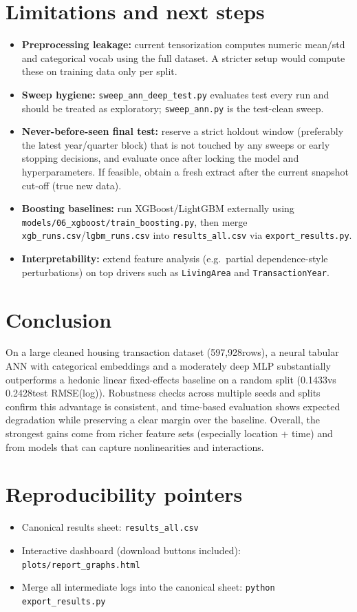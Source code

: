 \documentclass[11pt]{article}
\newcommand{\NTotal}{597{,}928}
\newcommand{\BestAnnTestRmse}{0.1433}
\newcommand{\BestHedTestRmse}{0.2428}
\begin{document}
\section{Limitations and next steps}
\begin{itemize}[leftmargin=*]
  \item \textbf{Preprocessing leakage:} current tensorization computes numeric mean/std and categorical vocab using the full dataset. A stricter setup would compute these on training data only per split.
  \item \textbf{Sweep hygiene:} \texttt{sweep\_ann\_deep\_test.py} evaluates test every run and should be treated as exploratory; \texttt{sweep\_ann.py} is the test-clean sweep.
  \item \textbf{Never-before-seen final test:} reserve a strict holdout window (preferably the latest year/quarter block) that is not touched by any sweeps or early stopping decisions, and evaluate once after locking the model and hyperparameters. If feasible, obtain a fresh extract after the current snapshot cut-off (true new data).
  \item \textbf{Boosting baselines:} run XGBoost/LightGBM externally using \texttt{models/06\_xgboost/train\_boosting.py}, then merge \texttt{xgb\_runs.csv}/\texttt{lgbm\_runs.csv} into \texttt{results\_all.csv} via \texttt{export\_results.py}.
  \item \textbf{Interpretability:} extend feature analysis (e.g.\ partial dependence-style perturbations) on top drivers such as \texttt{LivingArea} and \texttt{TransactionYear}.
\end{itemize}

\section{Conclusion}
On a large cleaned housing transaction dataset (\NTotal rows), a neural tabular ANN with categorical embeddings and a moderately deep MLP substantially outperforms a hedonic linear fixed-effects baseline on a random split (\BestAnnTestRmse vs \BestHedTestRmse test RMSE(log)). Robustness checks across multiple seeds and splits confirm this advantage is consistent, and time-based evaluation shows expected degradation while preserving a clear margin over the baseline. Overall, the strongest gains come from richer feature sets (especially location + time) and from models that can capture nonlinearities and interactions.

\section*{Reproducibility pointers}
\begin{itemize}[leftmargin=*]
  \item Canonical results sheet: \texttt{results\_all.csv}
  \item Interactive dashboard (download buttons included): \texttt{plots/report\_graphs.html}
  \item Merge all intermediate logs into the canonical sheet: \texttt{python export\_results.py}
\end{itemize}
\end{document}
